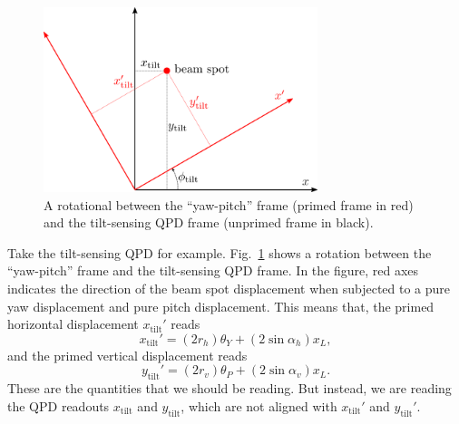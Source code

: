 \begin{figure}[!h]
	\centering
	\includegraphics[width=80mm]{figures/rotation}
	\caption{A rotational between the ``yaw-pitch'' frame (primed frame in red) and the tilt-sensing QPD frame (unprimed frame in black).}
	\label{fig:rotation}
\end{figure}
Take the tilt-sensing QPD for example.
Fig.~\ref{fig:rotation} shows a rotation between the ``yaw-pitch'' frame and the tilt-sensing QPD frame.
In the figure, red axes indicates the direction of the beam spot displacement when subjected to a pure yaw displacement and pure pitch displacement.
This means that, the primed horizontal displacement $x_\mathrm{tilt}'$ reads
\begin{equation}
	x_\mathrm{tilt}'=\left(2r_h\right)\theta_Y + \left(2\sin\alpha_h\right)x_L,
\end{equation}
and the primed vertical displacement reads
\begin{equation}
	y_\mathrm{tilt}'=\left(2r_v\right)\theta_P + \left(2\sin\alpha_v\right)x_L.
	\label{eqn:y_tilt'}
\end{equation}
These are the quantities that we should be reading.
But instead, we are reading the QPD readouts $x_\mathrm{tilt}$ and $y_\mathrm{tilt}$, which are not aligned with $x_\mathrm{tilt}'$ and $y_\mathrm{tilt}'$.

